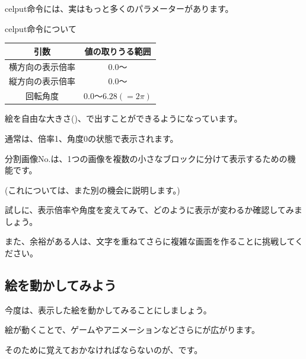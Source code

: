 celput命令には、実はもっと多くのパラメーターがあります。



\begin{itembox}[c]{celput命令について}
    \begin{center}
    \end{center}
    \begin{center}
        \begin{tabular}{cc} \hline
            引数 & 値の取りうる範囲 \\ \hline
            横方向の表示倍率 & $0.0〜$ \\
            縦方向の表示倍率 & $0.0〜$ \\
            回転角度 & $0.0〜6.28(=2\pi)$ \\ \hline
        \end{tabular}
    \end{center}
\end{itembox}

絵を自由な大きさ()、で出すことができるようになっています。

通常は、倍率1、角度0の状態で表示されます。

分割画像No.は、1つの画像を複数の小さなブロックに分けて表示するための機能です。

(これについては、また別の機会に説明します。)

試しに、表示倍率や角度を変えてみて、どのように表示が変わるか確認してみましょう。

また、余裕がある人は、文字を重ねてさらに複雑な画面を作ることに挑戦してください。



\newpage
\subsection{絵を動かしてみよう}



今度は、表示した絵を動かしてみることにしましょう。

絵が動くことで、ゲームやアニメーションなどさらにが広がります。

そのために覚えておかなければならないのが、です。


